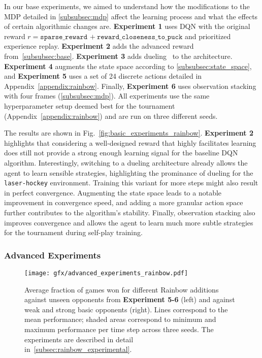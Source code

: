In our base experiments, we aimed to understand how the modifications to the MDP detailed in \ref{subsubsec:mdp} affect the learning process and what the effects of certain algorithmic changes are. \textbf{Experiment 1} uses DQN with the original reward $r = \texttt{sparse\_reward}$ $+\ \texttt{reward\_closeness\_to\_puck}$ and prioritized experience replay. \textbf{Experiment 2} adds the advanced reward from~\ref{subsubsec:base}. \textbf{Experiment 3} adds dueling~\cite{wang2016:DDQN} to the architecture. \textbf{Experiment 4} augments the state space according to \ref{subsubsec:state_space}, and \textbf{Experiment 5} uses a set of 24 discrete actions detailed in Appendix~\ref{appendix:rainbow}. Finally, \textbf{Experiment 6} uses observation stacking with four frames (\ref{subsubsec:mdp}). All experiments use the same hyperparameter setup deemed best for the tournament (Appendix~\ref{appendix:rainbow}) and are run on three different seeds.

The results are shown in Fig.~\ref{fig:basic_experiments_rainbow}. \textbf{Experiment 2} highlights that considering a well-designed reward that highly facilitates learning does still not provide a strong enough learning signal for the baseline DQN algorithm. Interestingly, switching to a dueling architecture already allows the agent to learn sensible strategies, highlighting the prominance of dueling for the \texttt{laser-hockey} environment. Training this variant for more steps might also result in perfect convergence. Augmenting the state space leads to a notable improvement in convergence speed, and adding a more granular action space further contributes to the algorithm's stability. Finally, observation stacking also improves convergence and allows the agent to learn much more subtle strategies for the tournament during self-play training.

\subsubsection{Advanced Experiments}\label{subsubsec:advanced}

\begin{figure}
    \centering
    \texttt{[image: gfx/advanced\_experiments\_rainbow.pdf]}
    \caption{Average fraction of games won for different Rainbow additions against unseen opponents from \textbf{Experiment 5-6} (left) and against weak and strong basic opponents (right). Lines correspond to the mean performance; shaded areas correspond to minimum and maximum performance per time step across three seeds. The experiments are described in detail in~\ref{subsec:rainbow_experimental}.}
    \label{fig:advanced_experiments_rainbow}
\end{figure}

